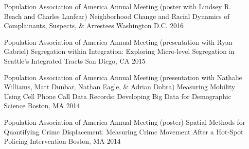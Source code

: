 \begin{cventries}

  \cventry
    {Population Association of America Annual Meeting (poster with Lindsey R. Beach and Charles Lanfear)} %
    {Neighborhood Change and Racial Dynamics of Complainants, Suspects, \& Arrestees} %
    {Washington D.C.} %
    {2016} %
    {}

  \cventry
    {Population Association of America Annual Meeting (presentation with Ryan Gabriel)} %
    {Segregation within Integration: Exploring Micro-level Segregation in Seattle's Integrated Tracts} %
    {San Diego, CA} %
    {2015} %
    {}

  \cventry
    {Population Association of America Annual Meeting (presentation with Nathalie Williams, Matt Dunbar, Nathan Eagle, \& Adrian Dobra)} %
    {Measuring Mobility Using Cell Phone Call Data Records: Developing Big Data for Demographic Science} %
    {Boston, MA} %
    {2014} %
    {}

  \cventry
    {Population Association of America Annual Meeting (poster)} %
    {Spatial Methods for Quantifying Crime Displacement: Measuring Crime Movement After a Hot-Spot Policing Intervention} %
    {Boston, MA} %
    {2014} %
    {}




\end{cventries}
